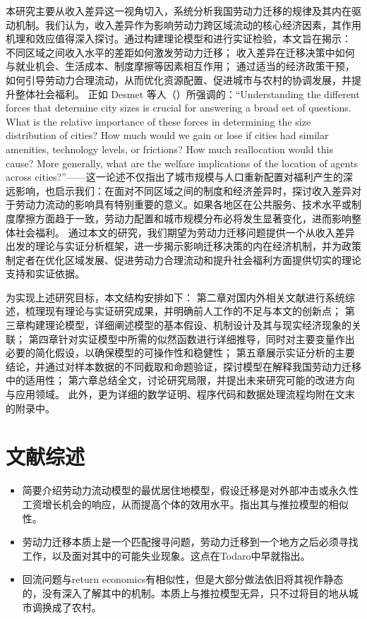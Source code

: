 \documentclass[a4paper,12pt]{article}
\begin{document}
本研究主要从收入差异这一视角切入，系统分析我国劳动力迁移的规律及其内在驱动机制。我们认为，收入差异作为影响劳动力跨区域流动的核心经济因素，其作用机理和效应值得深入探讨。通过构建理论模型和进行实证检验，本文旨在揭示： 不同区域之间收入水平的差距如何激发劳动力迁移；  收入差异在迁移决策中如何与就业机会、生活成本、制度摩擦等因素相互作用；  通过适当的经济政策干预，如何引导劳动力合理流动，从而优化资源配置、促进城市与农村的协调发展，并提升整体社会福利。
正如 Desmet 等人（\cite{desmetUrbanAccountingWelfare2013}）所强调的：“Understanding the different forces that determine city sizes is crucial for answering a broad set of questions. What is the relative importance of these forces in determining the size distribution of cities? How much would we gain or lose if cities had similar amenities, technology levels, or frictions? How much reallocation would this cause? More generally, what are the welfare implications of the location of agents across cities?”——这一论述不仅指出了城市规模与人口重新配置对福利产生的深远影响，也启示我们：在面对不同区域之间的制度和经济差异时，探讨收入差异对于劳动力流动的影响具有特别重要的意义。如果各地区在公共服务、技术水平或制度摩擦方面趋于一致，劳动力配置和城市规模分布必将发生显著变化，进而影响整体社会福利。
通过本文的研究，我们期望为劳动力迁移问题提供一个从收入差异出发的理论与实证分析框架，进一步揭示影响迁移决策的内在经济机制，并为政策制定者在优化区域发展、促进劳动力合理流动和提升社会福利方面提供切实的理论支持和实证依据。

为实现上述研究目标，本文结构安排如下：  
第二章对国内外相关文献进行系统综述，梳理现有理论与实证研究成果，并明确前人工作的不足与本文的创新点；  
第三章构建理论模型，详细阐述模型的基本假设、机制设计及其与现实经济现象的关联；  
第四章针对实证模型中所需的似然函数进行详细推导，同时对主要变量作出必要的简化假设，以确保模型的可操作性和稳健性；  
第五章展示实证分析的主要结论，并通过对样本数据的不同截取和命题验证，探讨模型在解释我国劳动力迁移中的适用性；  
第六章总结全文，讨论研究局限，并提出未来研究可能的改进方向与应用领域。  
此外，更为详细的数学证明、程序代码和数据处理流程均附在文末的附录中。




\section{文献综述}

\begin{itemize}
  \item 简要介绍劳动力流动模型的最优居住地模型，假设迁移是对外部冲击或永久性工资增长机会的响应，从而提高个体的效用水平。指出其与推拉模型的相似性。
  \item 劳动力迁移本质上是一个匹配搜寻问题，劳动力迁移到一个地方之后必须寻找工作，以及面对其中的可能失业现象。这点在Todaro中早就指出。
  \item 回流问题与return economics有相似性，但是大部分做法依旧将其视作静态的，没有深入了解其中的机制。本质上与推拉模型无异，只不过将目的地从城市调换成了农村。
\end{itemize}
\end{document}
